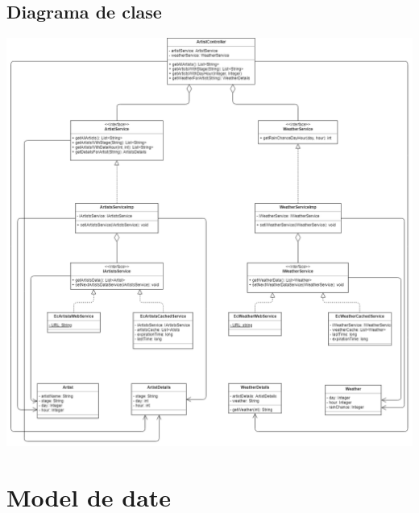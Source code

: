 \documentclass[11pt,a4paper,twoside,notitlepage]{article}
\begin{document}
\subsection{Diagrama de clase}
\includegraphics[height=.7\textheight, width=1.3\textwidth]{class}
\newpage

\section{Model de date}
\end{document}
